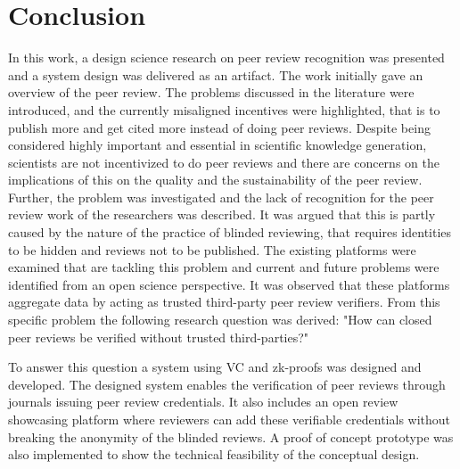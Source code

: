 
\chapter{Conclusion}\label{chapter:conclusion}

In this work, a design science research on peer review recognition was presented and a system design was delivered as an artifact. The work initially gave an overview of the peer review. The problems discussed in the literature were introduced, and the currently misaligned incentives were highlighted, that is to publish more and get cited more instead of doing peer reviews. Despite being considered highly important and essential in scientific knowledge generation, scientists are not incentivized to do peer reviews and there are concerns on the implications of this on the quality and the sustainability of the peer review. Further, the problem was investigated and the lack of recognition for the peer review work of the researchers was described. It was argued that this is partly caused by the nature of the practice of blinded reviewing, that requires identities to be hidden and reviews not to be published. The existing platforms were examined that are tackling this problem and current and future problems were identified from an open science perspective. It was observed that these platforms aggregate data by acting as trusted third-party peer review verifiers. From this specific problem the following research question was derived: "How can closed peer reviews be verified without trusted third-parties?"

To answer this question a system using \acrlong{VC} and \acrlong{zk-proofs} was designed and developed. The designed system enables the verification of peer reviews through journals issuing peer review credentials. It also includes an open review showcasing platform where reviewers can add these verifiable credentials without breaking the anonymity of the blinded reviews. A proof of concept prototype was also implemented to show the technical feasibility of the conceptual design.

